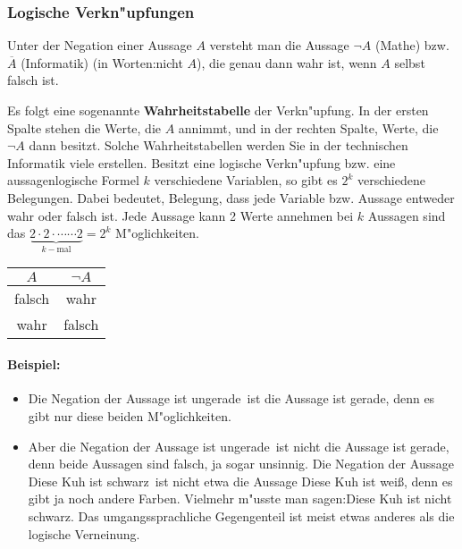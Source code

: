 \subsubsection{Logische Verkn"upfungen}
\begin{definition}[Negation]
Unter der Negation einer Aussage $A$ versteht man die Aussage $\neg A$ (Mathe) bzw. $\overline{A}$ (Informatik) (in Worten:\glqq nicht $A$\grqq ), die genau dann wahr ist, wenn $A$ selbst falsch ist.
\end{definition}
Es folgt eine sogenannte \textbf{Wahrheitstabelle} der Verkn"upfung. In der ersten Spalte stehen die Werte, die $A$ annimmt, und in der rechten Spalte, Werte, die $\neg A$ dann besitzt. Solche Wahrheitstabellen werden Sie in der technischen Informatik viele erstellen. Besitzt eine logische Verkn"upfung bzw. eine aussagenlogische Formel $k$ verschiedene Variablen, so gibt es $2^k$ verschiedene Belegungen. Dabei bedeutet, Belegung, dass jede Variable bzw. Aussage entweder wahr oder falsch ist. Jede Aussage kann 2 Werte annehmen bei $k$ Aussagen sind das $\underbrace{2 \cdot 2 \cdot \cdots \cdots 2}_{k-\text{mal}} = 2^k$ M"oglichkeiten.
\begin{center}
\begin{tabular}{c||c}
 $A$ & $\neg A$  \\ 
\hline
\cellcolor{ared}falsch  & \cellcolor{agreen}wahr   \\ 
\cellcolor{agreen}wahr  & \cellcolor{ared} falsch  \\ 
\hline
\end{tabular}
\end{center}

\paragraph*{Beispiel:}
\begin{itemize}
	\item Die Negation der Aussage  ist ungerade\grqq \ ist die Aussage  ist gerade\grqq , denn es gibt nur diese beiden M"oglichkeiten.
	\item Aber die Negation der Aussage  ist ungerade\grqq \ ist nicht die Aussage  ist gerade\grqq, denn beide Aussagen sind falsch, ja sogar unsinnig. Die Negation der Aussage \glqq Diese Kuh ist schwarz\grqq \ ist nicht etwa die Aussage \glqq Diese Kuh ist wei{\ss}\grqq , denn es gibt ja noch andere Farben. Vielmehr m"usste man sagen:\glqq Diese Kuh ist nicht schwarz\grqq. Das umgangssprachliche Gegengenteil ist meist etwas anderes als die logische Verneinung.
\end{itemize}


